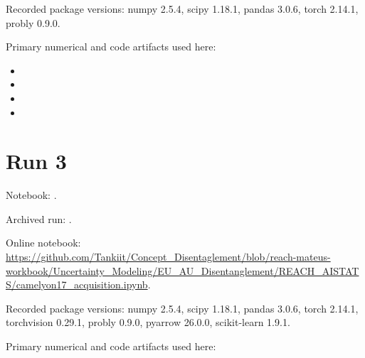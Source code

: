 Recorded package versions: numpy 2.5.4, scipy 1.18.1, pandas 3.0.6, torch 2.14.1, probly 0.9.0.

Primary numerical and code artifacts used here:

\begin{itemize}

\item {}

\item {}

\item {}

\item {}

\end{itemize}

\section{Run 3}

Notebook: .

Archived run: .

Online notebook: \url{https://github.com/Tankiit/Concept_Disentaglement/blob/reach-mateus-workbook/Uncertainty_Modeling/EU_AU_Disentanglement/REACH_AISTATS/camelyon17_acquisition.ipynb}.

Recorded package versions: numpy 2.5.4, scipy 1.18.1, pandas 3.0.6, torch 2.14.1, torchvision 0.29.1, probly 0.9.0, pyarrow 26.0.0, scikit-learn 1.9.1.

Primary numerical and code artifacts used here:

